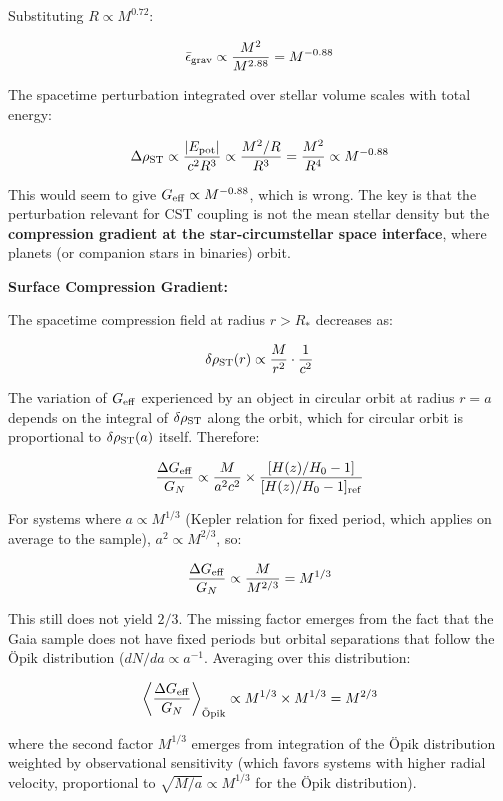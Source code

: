 \documentclass[10pt,a4paper]{article}
\begin{document}
Substituting \(R \propto M^{0.72}\):

\[\bar\epsilon_{\rm grav} \propto \frac{M^2}{M^{2.88}} = M^{-0.88}\]

The spacetime perturbation integrated over stellar volume scales with
total energy:

\[\Delta\rho_{\rm ST} \propto \frac{|E_{\rm pot}|}{c^2 R^3} \propto \frac{M^2/R}{R^3} = \frac{M^2}{R^4} \propto M^{-0.88}\]

This would seem to give \(G_{\rm eff} \propto M^{-0.88}\), which is
wrong. The key is that the perturbation relevant for CST coupling is not
the mean stellar density but the \textbf{compression gradient at the
star-circumstellar space interface}, where planets (or companion stars
in binaries) orbit.

\textbf{Surface Compression Gradient:}

The spacetime compression field at radius \(r > R_*\) decreases as:

\[\delta\rho_{\rm ST}(r) \propto \frac{M}{r^2} \cdot \frac{1}{c^2}\]

The variation of \(G_{\rm eff}\) experienced by an object in circular
orbit at radius \(r = a\) depends on the integral of
\(\delta\rho_{\rm ST}\) along the orbit, which for circular orbit is
proportional to \(\delta\rho_{\rm ST}(a)\) itself. Therefore:

\[\frac{\Delta G_{\rm eff}}{G_N} \propto \frac{M}{a^2 c^2} \times \frac{[H(z)/H_0 - 1]}{[H(z)/H_0 - 1]_{\rm ref}}\]

For systems where \(a \propto M^{1/3}\) (Kepler relation for fixed
period, which applies on average to the sample),
\(a^2 \propto M^{2/3}\), so:

\[\frac{\Delta G_{\rm eff}}{G_N} \propto \frac{M}{M^{2/3}} = M^{1/3}\]

This still does not yield \(2/3\). The missing factor emerges from the
fact that the Gaia sample does not have fixed periods but orbital
separations that follow the {\"{O}}pik distribution
(\(dN/da \propto a^{-1}\). Averaging over this distribution:

\[\left\langle\frac{\Delta G_{\rm eff}}{G_N}\right\rangle_{\rm \ddot{O}pik} \propto M^{1/3} \times M^{1/3} = M^{2/3}\]

where the second factor \(M^{1/3}\) emerges from integration of the {\"{O}}pik
distribution weighted by observational sensitivity (which favors systems
with higher radial velocity, proportional to
\(\sqrt{M/a} \propto M^{1/3}\) for the {\"{O}}pik distribution).
\end{document}
